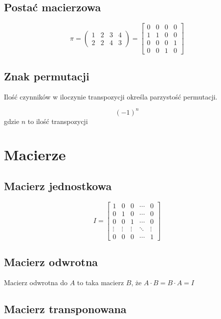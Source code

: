 \documentclass{../notatki}
\begin{document}
\subsection{Postać macierzowa}

$$
\pi =
\begin{pmatrix}
  1 & 2 & 3 & 4\\
  2 & 2 & 4 & 3
\end{pmatrix}
=
\begin{bmatrix}
  0 & 0 & 0 & 0\\
  1 & 1 & 0 & 0\\
  0 & 0 & 0 & 1\\
  0 & 0 & 1 & 0
\end{bmatrix}
$$

\subsection{Znak permutacji}

Ilość czynników w iloczynie transpozycji określa parzystość permutacji.

$$(-1)^n$$ gdzie $n$ to ilość transpozycji

\section{Macierze}

\subsection{Macierz jednostkowa}

$$
I =
\begin{bmatrix}
  1 & 0 & 0 & \cdots & 0 \\
  0 & 1 & 0 & \cdots & 0 \\
  0 & 0 & 1 & \cdots & 0 \\
  \vdots & \vdots & \vdots & \ddots & \vdots \\
  0 & 0 & 0 & \cdots & 1
\end{bmatrix}
$$

\subsection{Macierz odwrotna}

Macierz odwrotna do $A$ to taka macierz $B$, że $A \cdot B = B \cdot A = I$

\subsection{Macierz transponowana}
\end{document}
